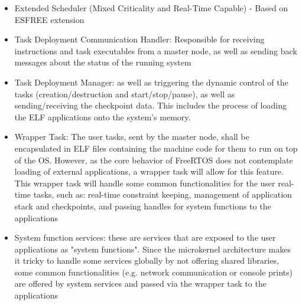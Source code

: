 \begin{center}
\end{center}


\begin{itemize}
	\item Extended Scheduler (Mixed Criticality and Real-Time Capable) - Based on ESFREE extension
	\item Task Deployment Communication Handler: Responsible for receiving instructions and task executables from a master node, as well as sending back messages about the status of the running system	
	\item Task Deployment Manager:  as well as triggering the dynamic control of the tasks (creation/destruction and start/stop/pause), as well as sending/receiving the checkpoint data. This includes the process of loading the ELF applications onto the system's memory.
	\item Wrapper Task: The user tasks, sent by the master node, shall be encapsulated in ELF files containing the machine code for them to run on top of the OS. However, as the core behavior of FreeRTOS does not contemplate loading of external applications, a wrapper task will allow for this feature. This wrapper task will handle some common functionalities for the user real-time tasks, such as: real-time constraint keeping, management of application stack and checkpoints, and passing handles for system functions to the applications
	\item System function services: these are services that are exposed to the user applications as "system functions". Since the microkernel architecture makes it tricky to handle some services globally by not offering shared libraries, some common functionalities (e.g. network communication or console prints) are offered by system services and passed via the wrapper task to the applications 
\end{itemize}

